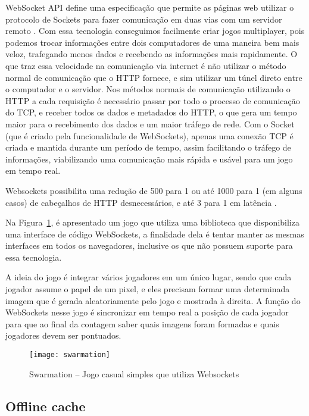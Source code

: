WebSocket API define uma especificação que permite as páginas web
utilizar o protocolo de Sockets para fazer comunicação em duas
vias com um servidor remoto \cite{website:w3cwebsockets}. Com essa tecnologia
conseguimos facilmente criar jogos multiplayer, pois podemos
trocar informações entre dois computadores de uma maneira bem mais
veloz, trafegando menos dados e recebendo as informações mais
rapidamente.
O que traz essa velocidade na comunicação via internet é não utilizar
o método normal de comunicação que o HTTP fornece, e sim utilizar um
túnel direto entre o computador e o servidor.
Nos métodos normais de comunicação utilizando o HTTP a cada requisição
é necessário passar por todo o processo de comunicação do TCP, e
receber todos os dados e metadados do HTTP, o que gera um tempo maior para
o recebimento dos dados e um maior tráfego de rede. Com o Socket (que
é criado pela funcionalidade de WebSockets), apenas uma conexão TCP é
criada e mantida durante um período de tempo, assim facilitando o
tráfego de informações, viabilizando uma comunicação mais rápida e
usável para um jogo em tempo real.

Websockets possibilita uma redução de 500 para 1 ou até 1000 para 1
(em alguns casos) de cabeçalhos de HTTP desnecessários, e até 3 para 1
em latência \cite{lubbers2010pro}.

Na Figura~\ref{img:swarmation}, é apresentado um jogo que utiliza
uma biblioteca que disponibiliza uma interface de código WebSockets,
a finalidade dela é tentar manter as mesmas interfaces em
todos os navegadores, inclusive os que não possuem suporte para essa
tecnologia.

A ideia do jogo é integrar vários jogadores em um único lugar, sendo que
cada jogador assume o papel de um pixel, e eles precisam formar uma
determinada imagem que é gerada aleatoriamente pelo jogo e mostrada à
direita. A função do WebSockets nesse jogo é sincronizar em tempo real a
posição de cada jogador para que ao final da contagem saber quais imagens
foram formadas e quais jogadores devem ser pontuados.

\begin{figure}[H]
  \centering
	\texttt{[image: swarmation]}
  \caption{Swarmation {--} Jogo casual simples que utiliza Websockets}
  \label{img:swarmation}
\end{figure}


\subsection{Offline cache}

